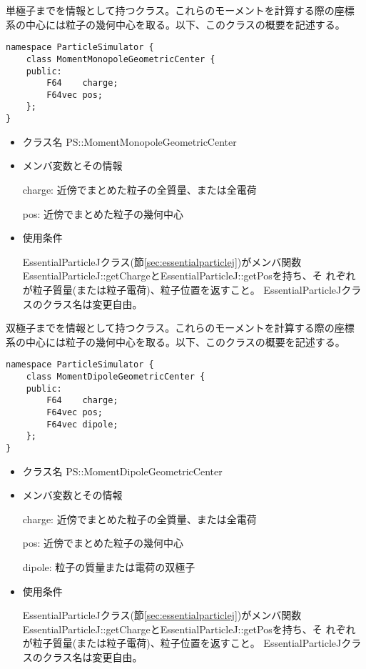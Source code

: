 単極子までを情報として持つクラス。これらのモーメントを計算する際の座標
系の中心には粒子の幾何中心を取る。以下、このクラスの概要を記述する。
\begin{screen}
\begin{verbatim}
namespace ParticleSimulator {
    class MomentMonopoleGeometricCenter {
    public:
        F64    charge;    
        F64vec pos;
    };
}
\end{verbatim}
\end{screen}

\begin{itemize}
\item クラス名
  PS::MomentMonopoleGeometricCenter

\item メンバ変数とその情報

  charge: 近傍でまとめた粒子の全質量、または全電荷

  pos: 近傍でまとめた粒子の幾何中心

\item 使用条件

  EssentialParticleJクラス(節\ref{sec:essentialparticlej})がメンバ関数
  EssentialParticleJ::getChargeとEssentialParticleJ::getPosを持ち、そ
  れぞれが粒子質量(または粒子電荷)、粒子位置を返すこと。
  EssentialParticleJクラスのクラス名は変更自由。

\end{itemize}

\label{sec:MomentDipoleGeometricCenter}

双極子までを情報として持つクラス。これらのモーメントを計算する際の座標
系の中心には粒子の幾何中心を取る。以下、このクラスの概要を記述する。
\begin{screen}
\begin{verbatim}
namespace ParticleSimulator {
    class MomentDipoleGeometricCenter {
    public:
        F64    charge;    
        F64vec pos;
        F64vec dipole;
    };
}
\end{verbatim}
\end{screen}

\begin{itemize}
\item クラス名
  PS::MomentDipoleGeometricCenter

\item メンバ変数とその情報

  charge: 近傍でまとめた粒子の全質量、または全電荷

  pos: 近傍でまとめた粒子の幾何中心

  dipole: 粒子の質量または電荷の双極子

\item 使用条件

  EssentialParticleJクラス(節\ref{sec:essentialparticlej})がメンバ関数
  EssentialParticleJ::getChargeとEssentialParticleJ::getPosを持ち、そ
  れぞれが粒子質量(または粒子電荷)、粒子位置を返すこと。
  EssentialParticleJクラスのクラス名は変更自由。

\end{itemize}

